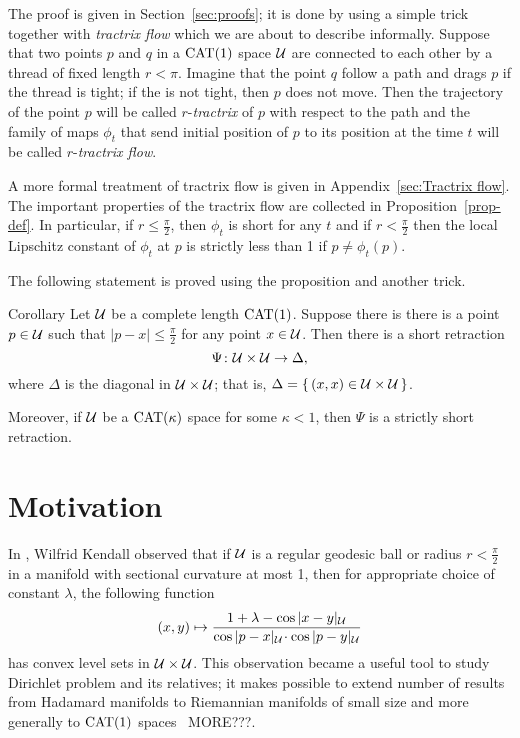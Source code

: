 \documentclass[oneside,a4paper, 12pt]{article}
\begin{document}
The proof is given in Section~\ref{sec:proofs};
it is done by using a simple trick together with \emph{tractrix flow} which we are about to describe informally.
Suppose that two points $p$ and $q$ in a $\mathrm{CAT}(1)$ space ${\mathcal{U}}$ are connected to each other by a thread of fixed length $r<\pi$.
Imagine that the point $q$ follow a path and drags $p$ if the thread is tight; 
if the is not tight, then $p$ does not move.
Then the trajectory of the point $p$ will be called $r$-\emph{tractrix} of $p$ with respect to the path
and the family of maps $\phi_t$ that send initial position of $p$ to its position at the time $t$ will be called $r$-\emph{tractrix flow}.

A more formal treatment of tractrix flow is given in Appendix~\ref{sec:Tractrix flow}.
The important properties of the tractrix flow are collected in Proposition~\ref{prop-def}.
In particular, if $r\le \tfrac\pi2$, then $\phi_t$ is short for any $t$ 
and if $r< \tfrac\pi2$ then the local Lipschitz constant of $\phi_t$ at $p$ is strictly less than 1 if $p\ne \phi_t(p)$.

The following statement is proved using the proposition and another trick. 

\begin{thm}{Corollary}\label{cor}
Let $\mathcal{U}$ be a complete length $\mathrm{CAT}(1)$.
Suppose there is there is a point $p\in \mathcal{U}$ such that $|p-x|\le \tfrac\pi2$ for any point $x\in \mathcal{U}$.
Then there is a short retraction 
\[\Psi\colon\mathcal{U}\times \mathcal{U}\to \Delta,\]
where $\Delta$ is the diagonal in $\mathcal{U}\times \mathcal{U}$;
that is, $\Delta=\{\,(x,x)\in \mathcal{U}\times \mathcal{U}\,\}$.
 
Moreover, if $\mathcal{U}$ be a $\mathrm{CAT}(\kappa)$ space for some $\kappa<1$, then $\Psi$ is a strictly short retraction.
\end{thm}

\section{Motivation}

In \cite[(4.1)]{kendall}, Wilfrid Kendall observed that if $\mathcal{U}$ is a regular geodesic ball or radius $r<\tfrac\pi2$ in a manifold with sectional curvature at most 1, then for appropriate choice of constant $\lambda$, the following function
\[(x,y)\mapsto 
\frac{1+\lambda-\cos|x-y|_{\spc{U}}}{\cos|p-x|_{\spc{U}}\cdot \cos|p-y|_{\spc{U}}}
\]
has convex level sets in ${\mathcal{U}}\times {\mathcal{U}}$.
This observation became a useful tool to study Dirichlet problem and its relatives;
it makes possible to extend number of results from Hadamard manifolds to Riemannian manifolds of small size
and more generally to $\mathrm{CAT}(1)$ spaces~\cite{yokota} MORE???.
\end{document}
